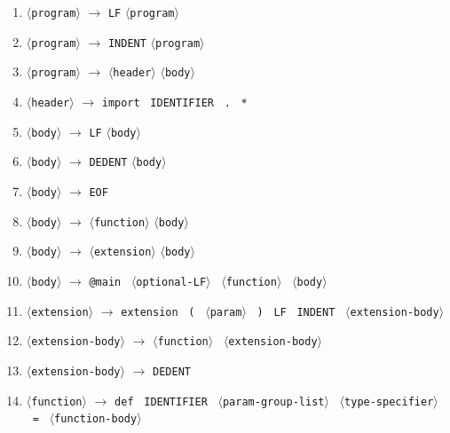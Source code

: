 \newcommand{\NT}[1]{$\langle$\texttt{#1}$\rangle$}
\newcommand{\T}[1]{\texttt{#1}}

\begin{enumerate}[label=\textbf{\arabic*)}, ref=\arabic*, leftmargin=*]

    \setlength\itemsep{-0.18em}

    \item \label{prod:program-a} \NT{program} $\rightarrow$ \T{LF} \NT{program}
    \item \label{prod:program-b} \NT{program} $\rightarrow$ \T{INDENT} \NT{program}
    \item \label{prod:program-c} \NT{program} $\rightarrow$ \NT{header} \NT{body}
    \medskip

    \item \label{prod:header-a} \NT{header} $\rightarrow$ \T{import} \ \T{IDENTIFIER} \ \T{.} \ \T{*}
    \medskip

    \item \label{prod:body-a} \NT{body} $\rightarrow$ \T{LF} \NT{body}
    \item \label{prod:body-b} \NT{body} $\rightarrow$ \T{DEDENT} \NT{body}
    \item \label{prod:body-c} \NT{body} $\rightarrow$ \T{EOF}
    \item \label{prod:body-d} \NT{body} $\rightarrow$ \NT{function} \NT{body}
    \item \label{prod:body-e} \NT{body} $\rightarrow$ \NT{extension} \NT{body}
    \item \label{prod:body-f} \NT{body} $\rightarrow$ \T{@main} \ \NT{optional-LF} \ \NT{function} \ \NT{body}
    \medskip

    \item \label{prod:extension-a} \NT{extension} $\rightarrow$ \T{extension} \ \T{(} \ \NT{param} \ \T{)} \ \T{LF} \ \T{INDENT} \ \NT{extension-body}
    \medskip

    \item \label{prod:extension-body-a} \NT{extension-body} $\rightarrow$ \NT{function} \ \NT{extension-body}
    \item \label{prod:extension-body-b} \NT{extension-body} $\rightarrow$ \T{DEDENT}
    \medskip

    \item \label{prod:function-a} \NT{function} $\rightarrow$ \T{def} \ \T{IDENTIFIER} \ \NT{param-group-list} \ \NT{type-specifier} \ \T{=} \ \NT{function-body}
    \medskip


\end{enumerate}
